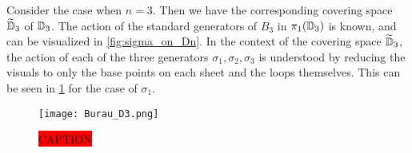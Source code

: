 \begin{example}\label{ex:Burau_D3}
    Consider the case when $n=3$. Then we have the corresponding covering space $\widetilde{\mathbb{D}}_3$ of $\mathbb{D}_3$. The action of the standard generators of $B_3$ in $\pi_1(\mathbb{D}_3)$ is known, and can be visualized in \cref{fig:sigma_on_Dn}. In the context of the covering space $\widetilde{\mathbb{D}}_3$, the action of each of the three generators $\sigma_1,\sigma_2,\sigma_3$ is understood by reducing the visuals to only the base points on each sheet and the loops themselves. This can be seen in \cref{fig:Burau_D3} for the case of $\sigma_1$.
    
    \begin{figure}[htbp]
        \centering
        \texttt{[image: Burau\_D3.png]}
        \caption{\colorbox{red}{CAPTION}}\label{fig:Burau_D3}
    \end{figure}


\end{example}
